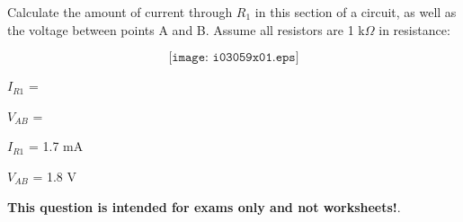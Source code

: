 

Calculate the amount of current through $R_1$ in this section of a circuit, as well as the voltage between points A and B.  Assume all resistors are 1 k$\Omega$ in resistance:

$$\texttt{[image: i03059x01.eps]}$$

$I_{R1}$ = 

\vskip 10pt

$V_{AB}$ = 

\vskip 10pt







$I_{R1}$ = 1.7 mA

\vskip 10pt

$V_{AB}$ = 1.8 V







{\bf This question is intended for exams only and not worksheets!}.


